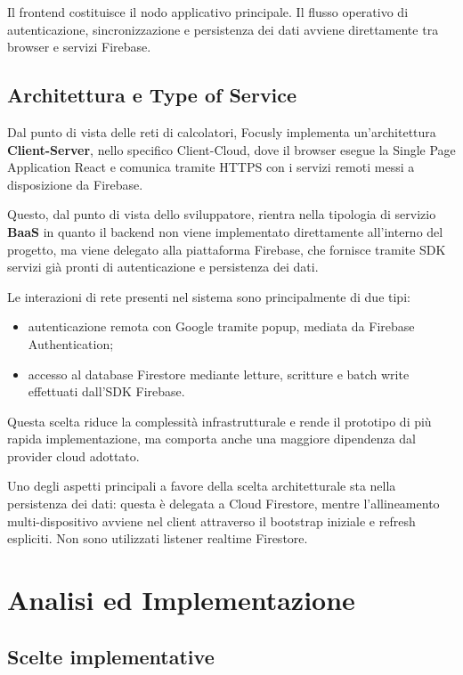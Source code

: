 \documentclass[11pt,a4paper]{article}
\begin{document}
\par Il frontend costituisce il nodo applicativo principale. Il flusso operativo di autenticazione, sincronizzazione e persistenza dei dati avviene direttamente tra browser e servizi Firebase.

\subsection{Architettura e Type of Service}

\par Dal punto di vista delle reti di calcolatori, Focusly implementa un'architettura \textbf{Client-Server}, nello specifico Client-Cloud, dove il browser esegue la Single Page Application React e comunica tramite HTTPS con i servizi remoti messi a disposizione da Firebase. 
\par Questo, dal punto di vista dello sviluppatore, rientra nella tipologia di servizio \textbf{BaaS} in quanto il backend non viene implementato direttamente all'interno del progetto, ma viene delegato alla piattaforma Firebase, che fornisce tramite SDK servizi già pronti di autenticazione e persistenza dei dati.

\par Le interazioni di rete presenti nel sistema sono principalmente di due tipi:
\begin{itemize}
  \item autenticazione remota con Google tramite popup, mediata da Firebase Authentication;
  \item accesso al database Firestore mediante letture, scritture e batch write effettuati dall'SDK Firebase.
\end{itemize}

\par Questa scelta riduce la complessità infrastrutturale e rende il prototipo di più rapida implementazione, ma comporta anche una maggiore dipendenza dal provider cloud adottato.
\par Uno degli aspetti principali a favore della scelta architetturale sta nella persistenza dei dati: questa è delegata a Cloud Firestore, mentre l'allineamento multi-dispositivo avviene nel client attraverso il bootstrap iniziale e refresh espliciti. Non sono utilizzati listener realtime Firestore.
\section{Analisi ed Implementazione}

\subsection{Scelte implementative}
\end{document}

